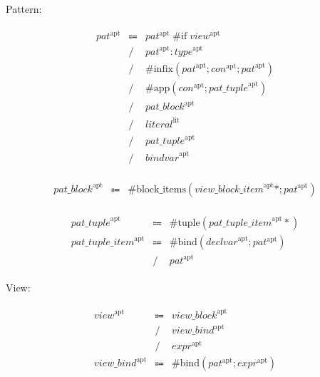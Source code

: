 Pattern:

\begin{align*}
    \begin{array}{rcll}
        \mathit{pat}^\mathrm{apt}
        &\Coloneq &\mathit{pat}^\mathrm{apt}\; \mathrm{\#if}\; \mathit{view}^\mathrm{apt} \\
        &\mathrel{/} &\mathit{pat}^\mathrm{apt}: \mathit{type}^\mathrm{apt} \\
        &\mathrel{/} &\mathrm{\#infix}(\mathit{pat}^\mathrm{apt}; \mathit{con}^\mathrm{apt}; \mathit{pat}^\mathrm{apt}) \\
        &\mathrel{/} &\mathrm{\#app}(\mathit{con}^\mathrm{apt}; \mathit{pat\_tuple}^\mathrm{apt}) \\
        &\mathrel{/} &\mathit{pat\_block}^\mathrm{apt} \\
        &\mathrel{/} &\mathit{literal}^\mathrm{lit} \\
        &\mathrel{/} &\mathit{pat\_tuple}^\mathrm{apt} \\
        &\mathrel{/} &\mathit{bindvar}^\mathrm{apt}
    \end{array}
\end{align*}

\begin{align*}
    \begin{array}{rcll}
        \mathit{pat\_block}^\mathrm{apt}
        &\Coloneq &\mathrm{\#block\_items}(\mathit{view\_block\_item}^\mathrm{apt}{*}; \mathit{pat}^\mathrm{apt})
    \end{array}
\end{align*}

\begin{align*}
    \begin{array}{rcll}
        \mathit{pat\_tuple}^\mathrm{apt}
        &\Coloneq &\mathrm{\#tuple}(\mathit{pat\_tuple\_item}^\mathrm{apt}{*}) \\
        \mathit{pat\_tuple\_item}^\mathrm{apt}
        &\Coloneq &\mathrm{\#bind}(\mathit{declvar}^\mathrm{apt}; \mathit{pat}^\mathrm{apt}) \\
        &\mathrel{/} &\mathit{pat}^\mathrm{apt}
    \end{array}
\end{align*}

View:

\begin{align*}
    \begin{array}{rcll}
        \mathit{view}^\mathrm{apt}
        &\Coloneq &\mathit{view\_block}^\mathrm{apt} \\
        &\mathrel{/} &\mathit{view\_bind}^\mathrm{apt} \\
        &\mathrel{/} &\mathit{expr}^\mathrm{apt} \\
        \mathit{view\_bind}^\mathrm{apt}
        &\Coloneq &\mathrm{\#bind}(\mathit{pat}^\mathrm{apt}; \mathit{expr}^\mathrm{apt})
    \end{array}
\end{align*}

